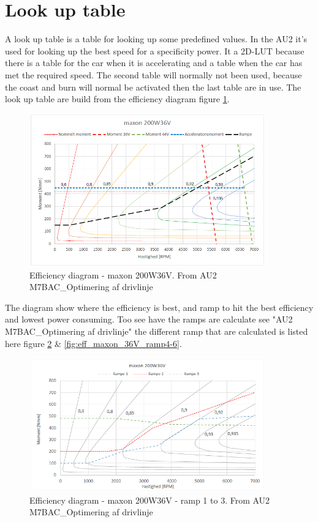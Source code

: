 \newpage
\section{Look up table}

A look up table is a table for looking up some predefined values. In the AU2 it's used for looking up the best speed for a specificity power. It a 2D-LUT because there is a table for the car when it is accelerating and a table when the car has met the required speed. The second table will normally not been used, because the coast and burn will normal be activated then the last table are in use. The look up table are build from the efficiency diagram figure \ref{fig:eff_maxon_36V}. 

\begin{figure}[H]
	\centering
	\includegraphics [width=4in]{Software/Pictures/maxon-200W36V.PNG}
	\caption{Efficiency diagram - maxon 200W36V. From AU2 M7BAC\_Optimering af drivlinje}
	\label{fig:eff_maxon_36V}
\end{figure}

The diagram show where the efficiency is best, and ramp to hit the best efficiency and lowest power consuming. Too see have the ramps are calculate see "AU2 M7BAC\_Optimering af drivlinje" the different ramp that are calculated is listed here figure \ref{fig:eff_maxon_36V_ramp1-3} \& \ref{fig:eff_maxon_36V_ramp4-6}.

\begin{figure}[H]
	\centering
	\includegraphics [width=4in]{Software/Pictures/Momentramper-1-3.PNG}
	\caption{Efficiency diagram - maxon 200W36V - ramp 1 to 3. From AU2 M7BAC\_Optimering af drivlinje}
	\label{fig:eff_maxon_36V_ramp1-3}
\end{figure}

